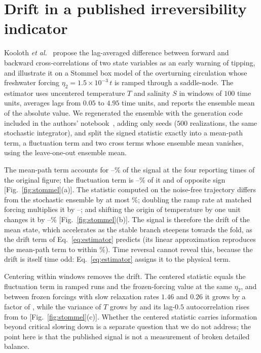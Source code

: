 \section{Drift in a published irreversibility indicator}\label{sec:stommel}

Kooloth \textit{et al.}~\cite{kooloth2026} propose the lag-averaged difference between forward and backward cross-correlations of two state variables as an early warning of tipping, and illustrate it on a Stommel box model of the overturning circulation whose freshwater forcing $\eta_2=1.5\times10^{-3}\,t$ is ramped through a saddle-node. The estimator uses uncentered temperature $T$ and salinity $S$ in windows of $100$ time units, averages lags from $0.05$ to $4.95$ time units, and reports the ensemble mean of the absolute value. We regenerated the ensemble with the generation code included in the authors' notebook~\cite{koolothcode2025}, adding only seeds ($500$ realizations, the same stochastic integrator), and split the signed statistic exactly into a mean-path term, a fluctuation term and two cross terms whose ensemble mean vanishes, using the leave-one-out ensemble mean.

The mean-path term accounts for \MPshareMin--\MPshareMax\% of the signal at the four reporting times of the original figure; the fluctuation term is \FLshareMin--\FLshareMax\% of it and of opposite sign [Fig.~\ref{fig:stommel}(a)]. The statistic computed on the noise-free trajectory differs from the stochastic ensemble by at most \DetDiffMax\%; doubling the ramp rate at matched forcing multiplies it by \EpsRatioMin--\EpsRatioMax; and shifting the origin of temperature by one unit changes it by \OriginMin--\OriginMax\% [Fig.~\ref{fig:stommel}(b)]. The signal is therefore the drift of the mean state, which accelerates as the stable branch steepens towards the fold, as the drift term of Eq.~\eqref{eq:estimator} predicts (its linear approximation reproduces the mean-path term to within \LinApproxDev\%). Time reversal cannot reveal this, because the drift is itself time odd: Eq.~\eqref{eq:estimator} assigns it to the physical term.

Centering within windows removes the drift. The centered statistic equals the fluctuation term in ramped runs and the frozen-forcing value at the same $\eta_2$, and between frozen forcings with slow relaxation rates $1.46$ and $0.26$ it grows by a factor of \VtwoGrowth, while the variance of $T$ grows by \VarGrowth{} and its lag-$0.5$ autocorrelation rises from \AConeFar{} to \AConeNear{} [Fig.~\ref{fig:stommel}(c)]. Whether the centered statistic carries information beyond critical slowing down is a separate question that we do not address; the point here is that the published signal is not a measurement of broken detailed balance.

